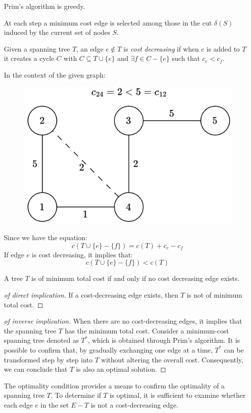 \begin{proposition}
    Prim's algorithm is greedy. 
\end{proposition}     
At each step a minimum cost edge is selected among those in the cut $\delta (S)$ induced by the current set of nodes $S$. 
\begin{definition}
    Given a spanning tree $T$, an edge $e \notin T$ is \emph{cost decreasing} if when $e$ is added to $T$ it creates a cycle $C$ with $C \subseteq T \cup \{e\}$ and $\exists f \in C-\{e\}$ such that $c_e<c_f$. 
\end{definition}
\begin{example}
    In the context of the given graph:
    \begin{figure}[H]
        \centering
        \includegraphics[width=0.5\linewidth]{images/costdecreasing.png}
    \end{figure}
    Since we have the equation:
    \[c(T \cup \{e\}-\{f\})=c(T)+c_e-c_f\]
    If edge $e$ is cost decreasing, it implies that:
    \[c(T \cup \{e\}-\{f\})<c(T)\]
\end{example}
\begin{theorem}
    A tree $T$ is of minimum total cost if and only if no cost decreasing edge exists. 
\end{theorem}
\begin{proof}[of direct implication]
    If a cost-decreasing edge exists, then $T$ is not of minimum total cost.
\end{proof}
\begin{proof}[of inverse implication]
    When there are no cost-decreasing edges, it implies that the spanning tree $T$ has the minimum total cost.
    Consider a minimum-cost spanning tree denoted as $T^{*}$, which is obtained through Prim's algorithm.
    It is possible to confirm that, by gradually exchanging one edge at a time, $T^{*}$ can be transformed step by step into $T$ without altering the overall cost.
    Consequently, we can conclude that $T$ is also an optimal solution.
\end{proof}
The optimality condition provides a means to confirm the optimality of a spanning tree $T$. 
To determine if $T$ is optimal, it is sufficient to examine whether each edge $e$ in the set $E-T$ is not a cost-decreasing edge.